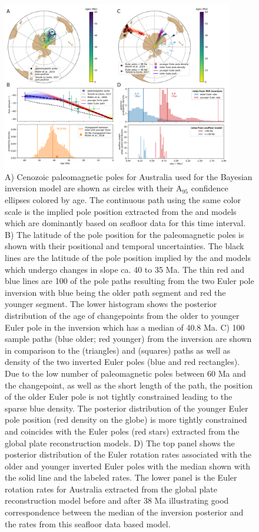 \documentclass[]{agujournal2019}
\begin{document}
\begin{figure}
\includegraphics[width=0.9\textwidth]{fig_aus_inversion.png}
\caption{A) Cenozoic paleomagnetic poles for Australia used for the Bayesian inversion model are shown as circles with their A$_{95}$ confidence ellipses colored by age. The continuous path using the same color scale is the implied pole position extracted from the  and  models which are dominantly based on seafloor data for this time interval. B) The latitude of the pole position for the paleomagnetic poles is shown with their positional and temporal uncertainties. The black lines are the latitude of the pole position implied by the  and  models which undergo changes in slope ca. 40 to 35 Ma. The thin red and blue lines are 100 of the pole paths resulting from the two Euler pole inversion with blue being the older path segment and red the younger segment. The lower histogram shows the posterior distribution of the age of changepoints from the older to younger Euler pole in the inversion which has a median of 40.8 Ma. C) 100 sample paths (blue older; red younger) from the inversion are shown in comparison to the  (triangles) and  (squares) paths as well as density of the two inverted Euler poles (blue and red rectangles). Due to the low number of paleomagnetic poles between 60 Ma and the changepoint, as well as the short length of the path, the position of the older Euler pole is not tightly constrained leading to the sparse blue density. The posterior distribution of the younger Euler pole position (red density on the globe) is more tightly constrained and coincides with the Euler poles (red stars) extracted from the global plate reconstruction models. D) The top panel shows the posterior distribution of the Euler rotation rates associated with the older and younger inverted Euler poles with the median shown with the solid line and the labeled rates. The lower panel is the Euler rotation rates for Australia extracted from the  global plate reconstruction model before and after 38 Ma illustrating good correspondence between the median of the inversion posterior and the rates from this seafloor data based model.}
\label{fig:Aus_Cenozoic_track}
\end{figure}
\end{document}
